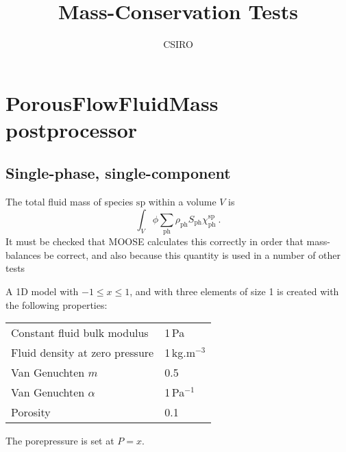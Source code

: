 \documentclass[]{scrreprt}
\def\species{\mathrm{sp}}
\def\phase{\mathrm{ph}}
\def\massfrac{\chi}
\begin{document}
\title{Mass-Conservation Tests}
\author{CSIRO}
\maketitle

\tableofcontents

\chapter{PorousFlowFluidMass postprocessor}

\section{Single-phase, single-component}
\label{1phase1comp.sec}

The total fluid mass of species $\species$ within a volume $V$ is
\begin{equation}
\int_{V} \phi\sum_{\phase}\rho_{\phase} S_{\phase}\massfrac_{\phase}^{\species} \ .
\end{equation}
It must be checked that MOOSE calculates this correctly in order that
mass-balances be correct, and also because this quantity is used in a
number of other tests

A 1D model with $-1\leq x \leq 1$, and with three elements of size 1 is
created with the following properties:
\begin{center}
\begin{tabular}{|ll|}
\hline
Constant fluid bulk modulus & 1\,Pa \\
Fluid density at zero pressure & 1\,kg.m$^{-3}$ \\
Van Genuchten $m$ & 0.5 \\
Van Genuchten $\alpha$ & 1\,Pa$^{-1}$ \\
Porosity & 0.1 \\
\hline
\end{tabular}
\end{center}
The porepressure is set at $P=x$.
\end{document}
